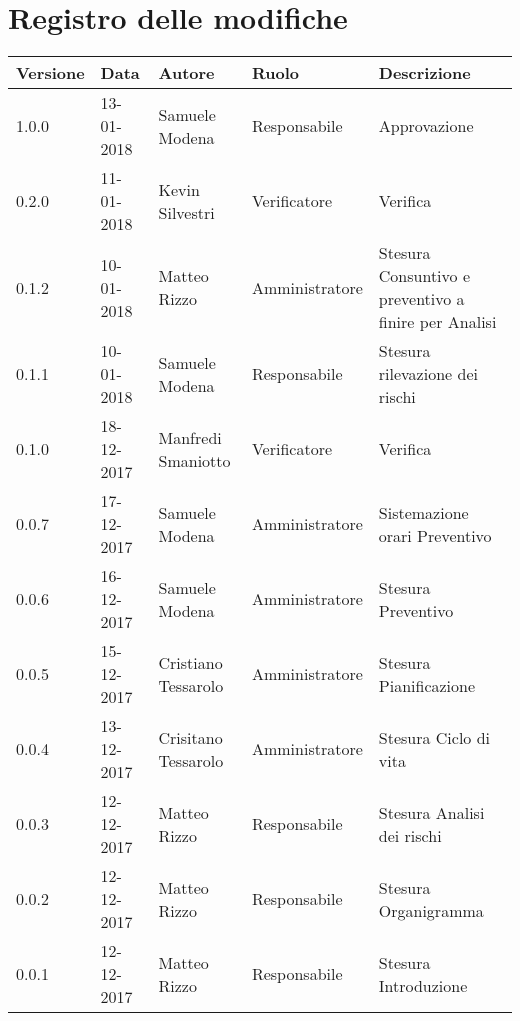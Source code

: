 \documentclass[./PianodiProgetto.tex]{subfiles}
\begin{document}
\chapter*{Registro delle modifiche}
\setlength\LTleft{-22mm}
\begin{longtable}{|p{20mm}|p{20mm}|p{40mm}|p{30mm}|p{50mm}|}
	\hline
	\textbf{Versione} & \textbf{Data} & \textbf{Autore} & \textbf{Ruolo} & \textbf{Descrizione} \\ 
		\hline 1.0.0 & 13-01-2018 & Samuele Modena & Responsabile & Approvazione \\
 
		\hline 0.2.0 & 11-01-2018 & Kevin Silvestri & Verificatore & Verifica \\
 
		\hline 0.1.2 & 10-01-2018 & Matteo Rizzo & Amministratore & Stesura Consuntivo e preventivo a finire per Analisi \\
 
		\hline 0.1.1 & 10-01-2018 & Samuele Modena & Responsabile & Stesura rilevazione dei rischi \\
 
		\hline 0.1.0 & 18-12-2017 & Manfredi Smaniotto & Verificatore & Verifica \\
 		
 		\hline 0.0.7 & 17-12-2017 & Samuele Modena & Amministratore & Sistemazione orari Preventivo \\
 		
		\hline 0.0.6 & 16-12-2017 & Samuele Modena & Amministratore & Stesura Preventivo \\
 
		\hline 0.0.5 & 15-12-2017 & Cristiano Tessarolo & Amministratore & Stesura Pianificazione \\
 
		\hline 0.0.4 & 13-12-2017 & Crisitano Tessarolo & Amministratore & Stesura Ciclo di vita \\
 
		\hline 0.0.3 & 12-12-2017 & Matteo Rizzo & Responsabile & Stesura Analisi dei rischi \\
 
 		\hline 0.0.2 & 12-12-2017 & Matteo Rizzo & Responsabile & Stesura Organigramma \\
 		
		\hline 0.0.1 & 12-12-2017 & Matteo Rizzo & Responsabile & Stesura Introduzione \\
 
		\hline
 
	\end{longtable}
\end{document}
